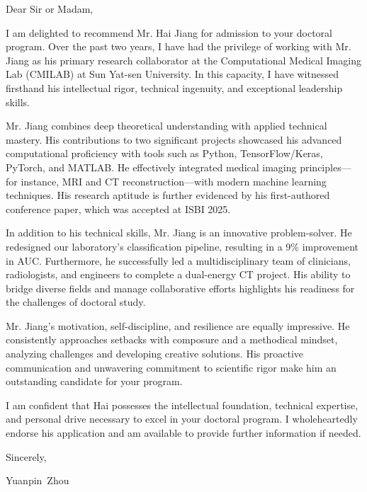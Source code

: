 \documentclass{article}
\begin{document}
Dear Sir or Madam, 

I am delighted to recommend Mr. Hai Jiang for admission to your doctoral program. Over the past two years, I have had the privilege of working with Mr. Jiang as his primary research collaborator at the Computational Medical Imaging Lab (CMILAB) at Sun Yat-sen University. In this capacity, I have witnessed firsthand his intellectual rigor, technical ingenuity, and exceptional leadership skills.

Mr. Jiang combines deep theoretical understanding with applied technical mastery. His contributions to two significant projects showcased his advanced computational proficiency with tools such as Python, TensorFlow/Keras, PyTorch, and MATLAB. He effectively integrated medical imaging principles—for instance, MRI and CT reconstruction—with modern machine learning techniques. His research aptitude is further evidenced by his first-authored conference paper, which was accepted at ISBI 2025.

In addition to his technical skills, Mr. Jiang is an innovative problem-solver. He redesigned our laboratory's classification pipeline, resulting in a 9\% improvement in AUC. Furthermore, he successfully led a multidisciplinary team of clinicians, radiologists, and engineers to complete a dual-energy CT project. His ability to bridge diverse fields and manage collaborative efforts highlights his readiness for the challenges of doctoral study.

Mr. Jiang's motivation, self-discipline, and resilience are equally impressive. He consistently approaches setbacks with composure and a methodical mindset, analyzing challenges and developing creative solutions. His proactive communication and unwavering commitment to scientific rigor make him an outstanding candidate for your program.

I am confident that Hai possesses the intellectual foundation, technical expertise, and personal drive necessary to excel in your doctoral program. I wholeheartedly endorse his application and am available to provide further information if needed.

\bigskip

Sincerely,
\vspace{10pt}

Yuanpin~Zhou\\
\vspace{10pt}
\end{document}
